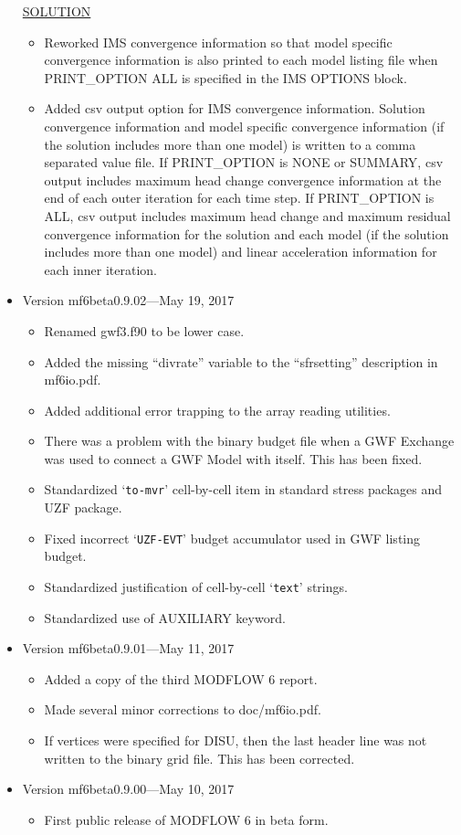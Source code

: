 \documentclass[11pt,twoside,twocolumn]{usgsreport}
\begin{document}
\begin{itemize}
\underline{SOLUTION}
\begin{itemize}
\item Reworked IMS convergence information so that model specific convergence information is also printed to each model listing file when PRINT\_OPTION ALL is specified in the IMS OPTIONS block.
\item Added csv output option for IMS convergence information. Solution convergence information and model specific convergence information (if the solution includes more than one model) is written to a comma separated value file. If PRINT\_OPTION is NONE or SUMMARY, csv output includes maximum head change convergence information at the end of each outer iteration for each time step. If PRINT\_OPTION is ALL, csv output includes maximum head change and maximum residual convergence information for the solution and each model (if the solution includes more than one model) and linear acceleration information for each inner iteration. 
\end{itemize}

\item
Version mf6beta0.9.02---May 19, 2017
\begin{itemize}
\item Renamed gwf3.f90 to be lower case.
\item Added the missing ``divrate'' variable to the ``sfrsetting'' description in mf6io.pdf.
\item Added additional error trapping to the array reading utilities.
\item There was a problem with the binary budget file when a GWF Exchange was used to connect a GWF Model with itself.  This has been fixed.
\item Standardized `\texttt{to-mvr}' cell-by-cell item in standard stress packages and UZF package.
\item Fixed incorrect `\texttt{UZF-EVT}' budget accumulator used in GWF listing budget. 
\item Standardized justification of cell-by-cell `\texttt{text}' strings.
\item Standardized use of AUXILIARY keyword.
\end{itemize}

\item
Version mf6beta0.9.01---May 11, 2017
\begin{itemize}
\item Added a copy of the third MODFLOW 6 report. 
\item Made several minor corrections to doc/mf6io.pdf.  
\item If vertices were specified for DISU, then the last header line was not written to the binary grid file.  This has been corrected.
\end{itemize}

\item
Version mf6beta0.9.00---May 10, 2017
\begin{itemize}
\item First public release of MODFLOW 6 in beta form. 
\end{itemize}
\end{itemize}
\end{document}
